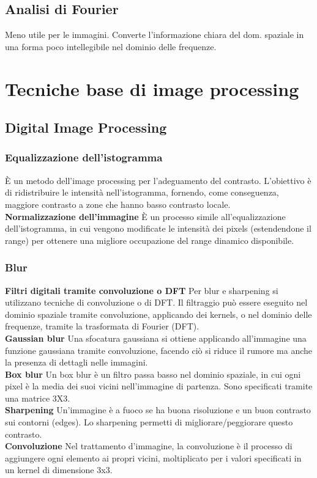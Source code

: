 \documentclass[8pt,a4paper]{article}
\begin{document}
\begin{multicols}{5}
    \subsection{Analisi di Fourier}
    Meno utile per le immagini. Converte l'informazione chiara del dom. spaziale
    in una forma poco intellegibile nel dominio delle frequenze.

    \section{Tecniche base di image processing}

    \subsection{Digital Image Processing}
    \subsubsection{Equalizzazione dell'istogramma}
    È un metodo dell’image processing per l’adeguamento del contrasto. L'obiettivo
    è di ridistribuire le intensità nell'istogramma, fornendo, come conseguenza, 
    maggiore contrasto a zone che hanno basso contrasto locale. \\
    \textbf{Normalizzazione dell’immagine} 
    È un processo simile all’equalizzazione 
    dell’istogramma, in cui vengono modificate le intensità dei pixels (estendendone
    il range) per ottenere una migliore occupazione del range dinamico disponibile.
    \subsubsection{Blur}
    \textbf{Filtri digitali tramite convoluzione o DFT} 
    Per blur e sharpening si utilizzano tecniche di convoluzione o di DFT. Il 
    filtraggio può essere eseguito nel dominio spaziale tramite convoluzione, 
    applicando dei kernels, o nel dominio delle frequenze, tramite la 
    trasformata di Fourier (DFT). \\
    \textbf{Gaussian blur}
    Una sfocatura gaussiana si ottiene applicando all’immagine una funzione gaussiana 
    tramite convoluzione, facendo ciò si riduce il rumore ma anche la presenza di 
    dettagli nelle immagini. \\
    \textbf{Box blur}
    Un box blur è un filtro passa basso nel dominio spaziale, in cui ogni pixel
    è la media dei suoi vicini nell’immagine di partenza. Sono specificati tramite
    una matrice 3X3. \\
    \textbf{Sharpening}
    Un’immagine è a fuoco se ha buona risoluzione e un buon contrasto sui contorni 
    (edges). Lo sharpening permetti di migliorare/peggiorare questo contrasto. \\
    \textbf{Convoluzione}
    Nel trattamento d’immagine, la convoluzione è il processo di aggiungere ogni 
    elemento ai propri vicini, moltiplicato per i valori specificati in un kernel 
    di dimensione 3x3.

\end{multicols}
\end{document}
